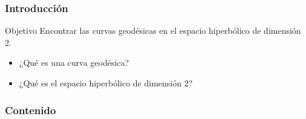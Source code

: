 \begin{frame}
\frametitle{Introducción}
  \begin{block}{Objetivo}
    Encontrar las curvas geodésicas en el espacio hiperbólico de dimensión 2.
  \end{block} \pause

  \begin{itemize}
    \item ¿Qué es una curva geodésica? \pause
    \item ¿Qué es el espacio hiperbólico de dimensión 2? 
  \end{itemize}
\end{frame}

\begin{frame}
\frametitle{Contenido}
\tableofcontents
\end{frame}
